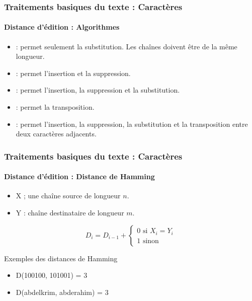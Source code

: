 \documentclass[xcolor=table]{beamer}
\begin{document}
\begin{frame}
\frametitle{Traitements basiques du texte : Caractères}
\framesubtitle{Distance d'édition : Algorithmes}

\begin{itemize}
	\item {} : permet seulement la substitution. Les chaînes doivent être de la même longueur. 
	\item {} : permet l'insertion et la suppression.
	\item {} : permet l'insertion, la suppression et la substitution.
	\item {} : permet la transposition.
	\item {} : permet l'insertion, la suppression, la substitution et la transposition entre deux caractères adjacents.
\end{itemize}

\end{frame}


\begin{frame}
	\frametitle{Traitements basiques du texte : Caractères}
	\framesubtitle{Distance d'édition : Distance de Hamming}
	
	\begin{itemize}
		\item X ; une chaîne source de longueur $n$.
		\item Y : chaîne destinataire de longueur $m$.
	\end{itemize}
	
	\[
	D_{i} = D_{i-1} + 
	\begin{cases}
	0 \text{ si } X_i = Y_i\\
	1 \text{ sinon}
	\end{cases}
	\]
	
	\begin{exampleblock}{Exemples des distances de Hamming}
		\begin{itemize}
			\item D(100100, 101001) = 3
			\item D(abdelkrim, abderahim) = 3
		\end{itemize}
	\end{exampleblock}
	
	
	
\end{frame}
\end{document}
